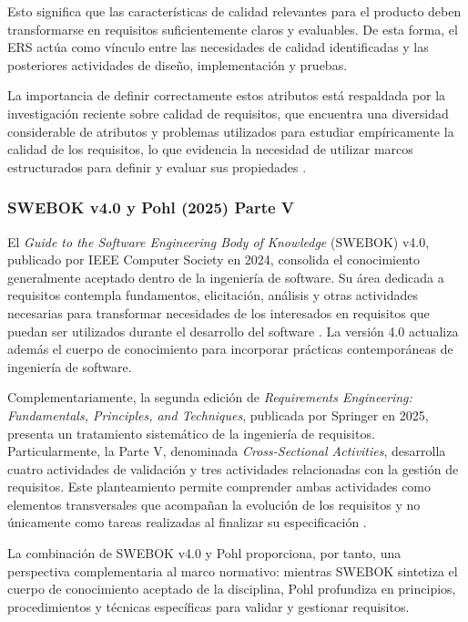 \documentclass[journal,onecolumn]{IEEEtran}
\begin{document}
	Esto significa que las características de calidad relevantes para el producto deben transformarse en requisitos suficientemente claros y evaluables. De esta forma, el ERS actúa como vínculo entre las necesidades de calidad identificadas y las posteriores actividades de diseño, implementación y pruebas.
	
	La importancia de definir correctamente estos atributos está respaldada por la investigación reciente sobre calidad de requisitos, que encuentra una diversidad considerable de atributos y problemas utilizados para estudiar empíricamente la calidad de los requisitos, lo que evidencia la necesidad de utilizar marcos estructurados para definir y evaluar sus propiedades \cite{Montgomery2022}.
	
	\subsubsection{SWEBOK v4.0 y Pohl (2025) Parte V}
	
	El \textit{Guide to the Software Engineering Body of Knowledge} (SWEBOK) v4.0, publicado por IEEE Computer Society en 2024, consolida el conocimiento generalmente aceptado dentro de la ingeniería de software. Su área dedicada a requisitos contempla fundamentos, elicitación, análisis y otras actividades necesarias para transformar necesidades de los interesados en requisitos que puedan ser utilizados durante el desarrollo del software \cite{Washizaki2024, Washizaki2024b}. La versión 4.0 actualiza además el cuerpo de conocimiento para incorporar prácticas contemporáneas de ingeniería de software.
	
	Complementariamente, la segunda edición de \textit{Requirements Engineering: Fundamentals, Principles, and Techniques}, publicada por Springer en 2025, presenta un tratamiento sistemático de la ingeniería de requisitos. Particularmente, la Parte V, denominada \textit{Cross-Sectional Activities}, desarrolla cuatro actividades de validación y tres actividades relacionadas con la gestión de requisitos. Este planteamiento permite comprender ambas actividades como elementos transversales que acompañan la evolución de los requisitos y no únicamente como tareas realizadas al finalizar su especificación \cite{Pohl2025}.
	
	La combinación de SWEBOK v4.0 y Pohl proporciona, por tanto, una perspectiva complementaria al marco normativo: mientras SWEBOK sintetiza el cuerpo de conocimiento aceptado de la disciplina, Pohl profundiza en principios, procedimientos y técnicas específicas para validar y gestionar requisitos.
	
\end{document}
